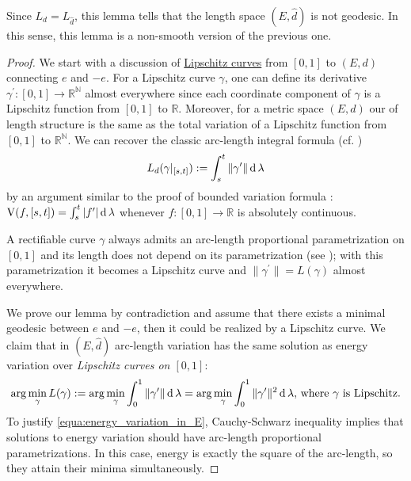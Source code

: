 Since $ L_d = L_{\hat{d}}$,
this lemma tells that the length space $(E, \hat{d})$ is not geodesic.
In this sense, this lemma is a non-smooth version of the previous one.

\begin{proof}
	We start with a discussion of \underline{Lipschitz curves} from $[0,1]$ to $(E,d)$ connecting $e$ and $-e$.
	For a Lipschitz curve $\gamma$,
	one can define its derivative $\gamma^\prime: [0,1] \rightarrow \mathbb{R}^\mathbb{N}$ almost everywhere
	since each coordinate component of $\gamma$ is a Lipschitz function from $[0,1]$ to $\mathbb{R}$.
	Moreover, for a metric space $(E,d)$ our  of length structure is the same as
	the total variation of a Lipschitz function from $[0,1]$ to $\mathbb{R}^\mathbb{N}$.
	We can recover the classic arc-length integral formula (cf. \cite[Theorem 2.7.6]{burago2001course})
	\[
		L_d(\gamma |_{[s,t]}):= \int_s^t \| \gamma^\prime \| \operatorname{d} \lambda
	\]
	by an argument similar to the proof of bounded variation formula
	\cite[Section 5.3]{Bogachev2007}:
	$\operatorname{V}(f, [s , t] )= \int_s^t |f^\prime| \operatorname{d} \lambda$ whenever $f: [0,1] \rightarrow \mathbb{R}$ is absolutely continuous.

	A rectifiable curve $\gamma$
	always admits an arc-length proportional parametrization on $[0,1]$
	and its length does not depend on its parametrization
	(see \cite[Section 2.5.1]{burago2001course});
	with this parametrization
	it becomes a Lipschitz curve and $\| \gamma^\prime \| = L(\gamma)$ almost everywhere.

	We prove our lemma by contradiction and
	assume that there exists a minimal geodesic between $e$ and $-e$,
	then it could be realized by a Lipschitz curve.
	We claim that in $(E, \hat{d})$ arc-length variation has the same solution as energy variation
	over \emph{Lipschitz curves on $[0,1]$}:
	\begin{equation}
		\label{equa:energy_variation_in_E}
		\arg \min_{\gamma} L (\gamma) :=
		\arg \min_{\gamma} \int_{0}^{1} \| \gamma^\prime \| \operatorname{d} \lambda =
		\arg \min_{\gamma} \int_{0}^{1} \| \gamma^\prime \| ^2 \operatorname{d} \lambda
		\text{, where } \gamma \text{ is Lipschitz}.
	\end{equation}
	To justify \cref{equa:energy_variation_in_E},
	Cauchy-Schwarz inequality implies that
	solutions to energy variation should have arc-length proportional parametrizations.
	In this case, energy is exactly the square of the arc-length,
	so they attain their minima simultaneously.


\end{proof}
